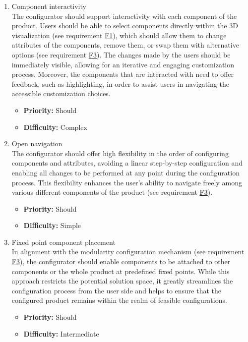 \begin{enumerate}[label=\textbf{F\arabic*:}, leftmargin=30pt]
\item \label{itm:F4} Component interactivity
\vspace{2pt}
\\The configurator should support interactivity with each component of the product. Users should be able to select components directly within the 3D visualization (see requirement \hyperref[itm:F1]{F1}), which should allow them to change attributes of the components, remove them, or swap them with alternative options (see requirement \hyperref[itm:F3]{F3}). The changes made by the users should be immediately visible, allowing for an iterative and engaging customization process. Moreover, the components that are interacted with need to offer feedback, such as highlighting, in order to assist users in navigating the accessible customization choices.
\begin{itemize}[noitemsep, label=\trianglebullet]
    \item \textbf{Priority:} Should
    \item \textbf{Difficulty:} Complex
\end{itemize}
\vspace{4pt}

\item \label{itm:F5} Open navigation
\vspace{2pt}
\\The configurator should offer high flexibility in the order of configuring components and attributes, avoiding a linear step-by-step configuration and enabling all changes to be performed at any point during the configuration process. This flexibility enhances the user's ability to navigate freely among various different components of the product (see requirement \hyperref[itm:F3]{F3}).
\begin{itemize}[noitemsep, label=\trianglebullet]
    \item \textbf{Priority:} Should
    \item \textbf{Difficulty:} Simple
\end{itemize}
\vspace{4pt}

\item \label{itm:F6} Fixed point component placement
\vspace{2pt}
\\In alignment with the modularity configuration mechanism (see requirement \hyperref[itm:F3]{F3}), the configurator should enable components to be attached to other components or the whole product at predefined fixed points. While this approach restricts the potential solution space, it greatly streamlines the configuration process from the user side and helps to ensure that the configured product remains within the realm of feasible configurations.
\begin{itemize}[noitemsep, label=\trianglebullet]
    \item \textbf{Priority:} Should
    \item \textbf{Difficulty:} Intermediate
\end{itemize}
\vspace{4pt}


\end{enumerate}
